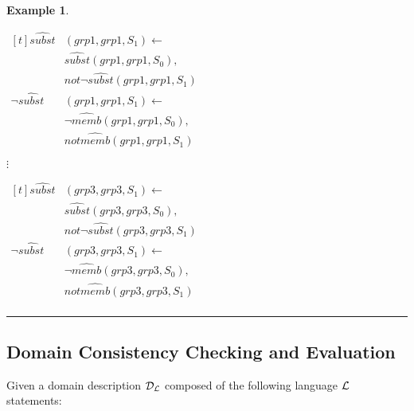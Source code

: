 \documentclass[11pt, twocolumn]{article}
\newtheorem{vexmpl}{Example}
\newenvironment{vexample}
  {\begin{vexmpl}\rm}
  {\rule{2mm}{2mm}\end{vexmpl}}
\begin{document}
\begin{vexample}
\begin{enumerate}
              \begin{math}
                \begin{aligned}[t]
                  \hat{subst}&(grp1, grp1, S_{1}) \leftarrow \\
                  & \hat{subst}(grp1, grp1, S_{0}), \\
                  & not \lnot \hat{subst}(grp1, grp1, S_{1}) \\
                  \lnot \hat{subst}&(grp1, grp1, S_{1}) \leftarrow \\
                  & \lnot \hat{memb}(grp1, grp1, S_{0}), \\
                  & not \hat{memb}(grp1, grp1, S_{1})
                \end{aligned}
              \end{math}

              \hspace{1cm} $\vdots$

              \begin{math}
                \begin{aligned}[t]
                  \hat{subst}&(grp3, grp3, S_{1}) \leftarrow \\
                  & \hat{subst}(grp3, grp3, S_{0}), \\
                  & not \lnot \hat{subst}(grp3, grp3, S_{1}) \\
                  \lnot \hat{subst}&(grp3, grp3, S_{1}) \leftarrow \\
                  & \lnot \hat{memb}(grp3, grp3, S_{0}), \\
                  & not \hat{memb}(grp3, grp3, S_{1}) \\
                \end{aligned}
              \end{math}
          \end{enumerate}
        \end{vexample}
      \subsection{Domain Consistency Checking and Evaluation}

        Given a domain description ${\cal D_{L}}$ composed of the following
        language ${\cal L}$ statements:
\end{document}

